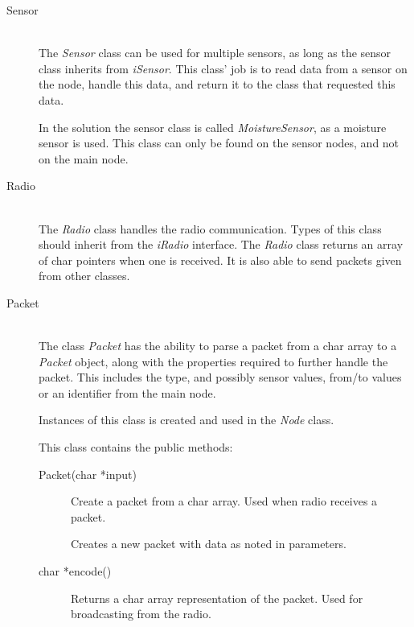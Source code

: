 \begin{description}
\item[Sensor] \hfill \\
The \textit{Sensor} class can be used for multiple sensors, as long as the sensor class inherits from \textit{iSensor}. This class' job is to read data from a sensor on the node, handle this data, and return it to the class that requested this data.

In the solution the sensor class is called \textit{MoistureSensor}, as a moisture sensor is used. This class can only be found on the sensor nodes, and not on the main node.


\item[Radio] \hfill \\
The \textit{Radio} class handles the radio communication. Types of this class should inherit from the \textit{iRadio} interface. The \textit{Radio} class returns an array of char pointers when one is received. It is also able to send packets given from other classes.

\item[Packet] \hfill \\
The class \textit{Packet} has the ability to parse a packet from a char array to a \textit{Packet} object, along with the properties required to further handle the packet. This includes the type, and possibly sensor values, from/to values or an identifier from the main node.

Instances of this class is created and used in the \textit{Node} class.

This class contains the public methods:
\begin{description}
\item[Packet(char *input)] Create a packet from a char array. Used when radio receives a packet.
\item[{\parbox[t]{0.6\linewidth}{Packet(PacketType packetTypeInput, \\ uint16\_t addresserInput, \\ uint16\_t addresseeInput, \\ uint16\_t originInput, \\ uint16\_t value1Input, \\ uint16\_t value2Input, \\ uint16\_t value3Input)}}] \item[] Creates a new packet with data as noted in parameters.
\item[char *encode()] Returns a char array representation of the packet. Used for broadcasting from the radio.
\end{description}

\end{description}


